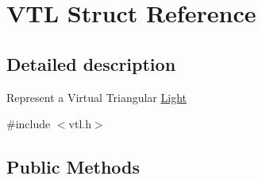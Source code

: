 \hypertarget{struct_v_t_l}{}\section{V\+TL Struct Reference}
\label{struct_v_t_l}


\subsection{Detailed description}
Represent a Virtual Triangular \hyperlink{struct_light}{Light} 

{\ttfamily \#include $<$vtl.\+h$>$}

\subsection*{Public Methods}
